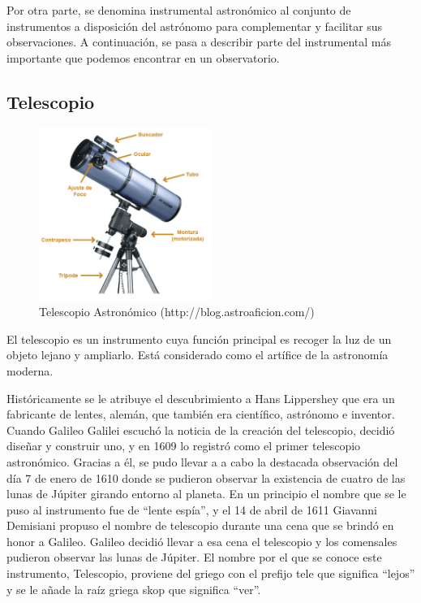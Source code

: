 Por otra parte, se denomina instrumental astronómico al conjunto de instrumentos a disposición del astrónomo para complementar y facilitar sus observaciones.
A continuación, se pasa a describir parte del instrumental más importante que podemos encontrar en un observatorio.


\subsection{Telescopio}
\begin{figure}[htb]
\centering
\includegraphics[width=0.5\textwidth]{./imagenes/telescopio}
\caption{Telescopio Astronómico (http://blog.astroaficion.com/)} \label{fig:telescopio}
\end{figure}

El telescopio es un instrumento cuya función principal es recoger la luz de un objeto lejano y ampliarlo. Está considerado como el artífice de la astronomía moderna.

Históricamente se le atribuye el descubrimiento a Hans Lippershey que era un fabricante de lentes, alemán, que también era científico, astrónomo e inventor.
Cuando Galileo Galilei escuchó la noticia de la creación del telescopio, decidió diseñar y construir uno, y en 1609 lo registró como el primer telescopio astronómico. Gracias a él, se pudo llevar a a cabo la destacada observación del día 7 de enero de 1610 donde se pudieron observar la existencia de cuatro de las lunas de Júpiter girando entorno al planeta.
En un principio el nombre que se le puso al instrumento fue de “lente espía”, y el 14 de abril de 1611 Giavanni Demisiani propuso el nombre de telescopio durante una cena que se brindó en honor a Galileo. Galileo decidió llevar a esa cena el telescopio y los comensales pudieron observar las lunas de Júpiter. El nombre por el que se conoce este instrumento, Telescopio, proviene del griego con el prefijo tele que significa “lejos” y se le añade la raíz griega skop que significa “ver”.

